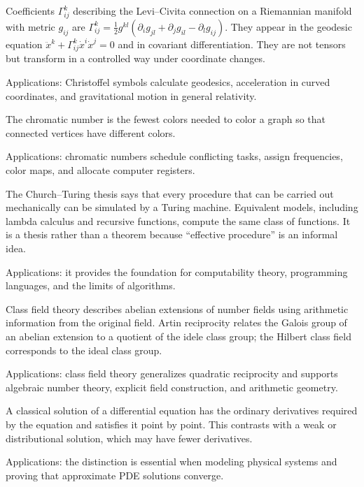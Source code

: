 Coefficients $\Gamma^k_{ij}$ describing the Levi--Civita connection on a Riemannian manifold with metric $g_{ij}$ are $\Gamma^k_{ij}=\frac12g^{kl}(\partial_i g_{jl}+\partial_jg_{il}-\partial_lg_{ij})$. They appear in the geodesic equation $\ddot{x}^k+\Gamma^k_{ij}\dot{x}^i\dot{x}^j=0$ and in covariant differentiation. They are not tensors but transform in a controlled way under coordinate changes. \par\noindent Applications: Christoffel symbols calculate geodesics, acceleration in curved coordinates, and gravitational motion in general relativity.

The chromatic number is the fewest colors needed to color a graph so that connected vertices have different colors.  \par\noindent Applications: chromatic numbers schedule conflicting tasks, assign frequencies, color maps, and allocate computer registers.

The Church--Turing thesis says that every procedure that can be carried out mechanically can be simulated by a Turing machine. Equivalent models, including lambda calculus and recursive functions, compute the same class of functions. It is a thesis rather than a theorem because “effective procedure” is an informal idea. \par\noindent Applications: it provides the foundation for computability theory, programming languages, and the limits of algorithms.

Class field theory describes abelian extensions of number fields using arithmetic information from the original field. Artin reciprocity relates the Galois group of an abelian extension to a quotient of the idele class group; the Hilbert class field corresponds to the ideal class group. \par\noindent Applications: class field theory generalizes quadratic reciprocity and supports algebraic number theory, explicit field construction, and arithmetic geometry.

A classical solution of a differential equation has the ordinary derivatives required by the equation and satisfies it point by point. This contrasts with a weak or distributional solution, which may have fewer derivatives. \par\noindent Applications: the distinction is essential when modeling physical systems and proving that approximate PDE solutions converge.

